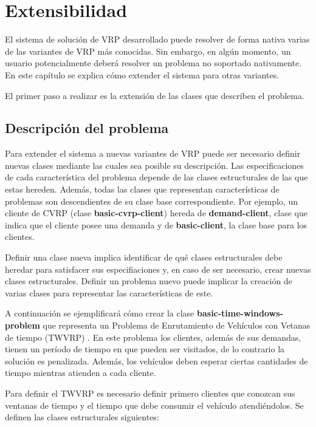 \chapter{Extensibilidad}\label{chapter:Extension}

El sistema de solución de VRP desarrollado puede resolver de forma nativa varias de las variantes de VRP más conocidas. Sin embargo, en algún momento, un usuario potencialmente deberá resolver un problema no soportado nativamente. En este capítulo se explica cómo extender el sistema para otras variantes.

El primer paso a realizar es la extensión de las clases que describen el problema.

\section{Descripción del problema}\label{4-description}
Para extender el sistema a nuevas variantes de VRP puede ser necesario definir nuevas clases mediante las cuales sea posible su descripción. Las especificaciones de cada característica del problema depende de las clases estructurales de las que estas hereden. Además, todas las clases que representan características de problemas son descendientes de su clase base correspondiente. Por ejemplo, un cliente de CVRP (clase \textbf{basic-cvrp-client}) hereda de \textbf{demand-client}, clase que indica que el cliente posee una demanda y de \textbf{basic-client}, la clase base para los clientes.

Definir una clase nueva implica identificar de qué clases estructurales debe heredar para satisfacer sus especifiaciones y, en caso de ser necesario, crear nuevas clases estructurales. Definir un problema nuevo puede implicar la creación de varias clases para representar las características de este.

A continuación se ejemplificará cómo crear la clase \textbf{basic-time-windows-problem} que representa un Problema de Enrutamiento de Vehículos con Vetanas de tiempo (TWVRP) \cite{TODO}. En este problema los clientes, además de sus demandas, tienen un período de tiempo en que pueden ser visitados, de lo contrario la solución es penalizada. Además, los vehículos deben esperar ciertas cantidades de tiempo mientras atienden a cada cliente.

Para definir el TWVRP es necesario definir primero clientes que conozcan sus ventanas de tiempo y el tiempo que debe consumir el vehículo atendiéndolos. Se definen las clases estructurales siguientes:

